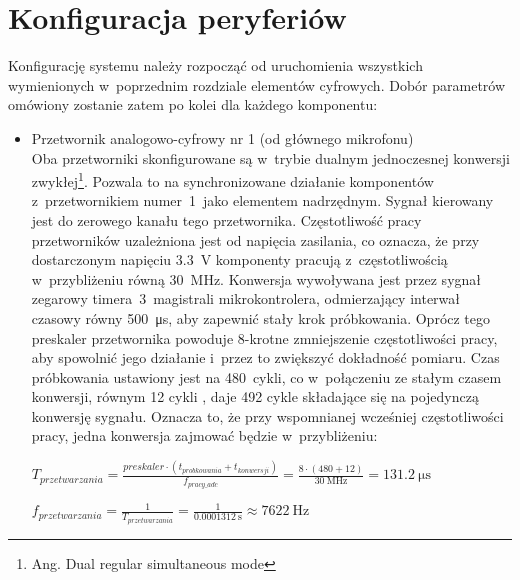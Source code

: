 \section{Konfiguracja peryferiów}
\label{sec:configuration}
Konfigurację systemu należy rozpocząć od uruchomienia wszystkich wymienionych w~poprzednim rozdziale elementów cyfrowych. Dobór parametrów omówiony zostanie zatem po kolei dla każdego komponentu:
\begin{itemize}
	\item Przetwornik analogowo-cyfrowy nr 1 (od głównego mikrofonu)\\
	Oba przetworniki skonfigurowane są w~trybie dualnym jednoczesnej konwersji zwykłej\footnote{Ang. Dual regular simultaneous mode}. Pozwala to na synchronizowane działanie komponentów z~przetwornikiem numer~1~jako elementem nadrzędnym. Sygnał kierowany jest do zerowego kanału tego przetwornika. Częstotliwość pracy przetworników uzależniona jest od napięcia zasilania, co oznacza, że przy dostarczonym napięciu \SI{3.3}{\V} komponenty pracują z~częstotliwością w~przybliżeniu równą \SI{30}{\MHz}. Konwersja wywoływana jest przez sygnał zegarowy timera~3~magistrali mikrokontrolera, odmierzający interwał czasowy równy \SI{500}{\micro\s}, aby zapewnić stały krok próbkowania. Oprócz tego preskaler przetwornika powoduje 8-krotne zmniejszenie częstotliwości pracy, aby spowolnić jego działanie i~przez to zwiększyć dokładność pomiaru. Czas próbkowania ustawiony jest na 480~cykli, co w~połączeniu ze stałym czasem konwersji, równym 12 cykli \cite{RM0390}, daje 492 cykle składające się na pojedynczą konwersję sygnału. Oznacza to, że przy wspomnianej wcześniej częstotliwości pracy, jedna konwersja zajmować będzie w~przybliżeniu:
		
\begin{center}
		$ T_{przetwarzania} = \frac{preskaler \cdot (t_{probkowania} + t_{konwersji})}{f_{pracy\_adc}} = \frac{8\cdot(480+12)}{\SI{30}{\MHz}} = \SI{131,2}{\micro\s} $
	
	$ f_{przetwarzania} = \frac{1}{T_{przetwarzania}} = \frac{1}{\SI{0.0001312}{\s}} \approx \SI{7622}{\Hz} $ 
	

\end{center}
\end{itemize}
